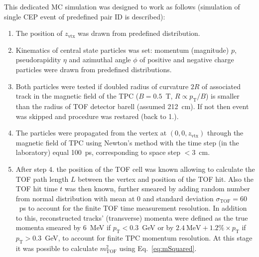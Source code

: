 This dedicated MC simulation was designed to work as follows (simulation of single CEP event of predefined pair ID is described):
\begin{enumerate}
 \item The position of $z_{\text{vtx}}$ was drawn from predefined distribution.
 \item Kinematics of central state particles was set: momentum (magnitude) $p$, pseudorapidity $\eta$ and azimuthal angle $\phi$ of positive and negative charge particles were drawn from predefined distributions.
 \item Both particles were tested if doubled radius of curvature $2R$ of associated track in the magnetic field of the TPC ($B=0.5$~T, $R \propto p_{\text{T}}/B$) is smaller than the radius of TOF detector barell (assumed 212~cm). If not then event was skipped and procedure was restared (back to 1.).
 \item The particles were propagated from the vertex at $(0,0,z_{\text{vtx}})$ through the magnetic field of TPC using Newton's method with the time step (in the laboratory) equal 100~ps, corresponding to space step $<3$~cm.
 \item After step 4. the position of the TOF cell was known allowing to calculate the TOF path length $L$ between the vertex and position of the TOF hit. Also the TOF hit time $t$ was then known, further smeared by adding random number from normal distribution with mean at 0 and standard deviation $\sigma_{\text{TOF}}=60$~ps to account for the finite TOF time measurement resolution. In addition to this, reconstructed tracks' (transverse) momenta were defined as the true momenta smeared by 6~MeV if $p_{\text{T}}<0.3$~GeV or by $2.4~\text{MeV} + 1.2\%\times p_{\text{T}}$ if $p_{\text{T}}>0.3$~GeV, to account for finite TPC momentum resolution. At this stage it was possible to calculate $m^{2}_{\text{TOF}}$ using Eq.~\eqref{eq:mSquared}.

\end{enumerate}

